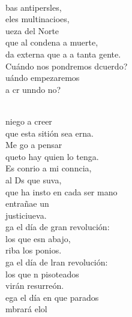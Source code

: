 \begin{cancion}
	\jump\\
	bas antipersles,\\
	eles multinacioes,\\
	ueza del Norte\\
	que al  condena a muerte,\\
	da externa que a a tanta gente.\\
	Cuándo nos pondremos dcuerdo?\\
	uándo empezaremos\\
	a cr unndo no?  \\\jump\\
	\begin{chorus}%
	 niego a creer\\
	que esta sitión sea erna.\\
	Me go a pensar \\
	queto hay quien lo tenga.\\
	Es conrio a mi conncia,\\
	al Ds que suva,\\
	que ha insto en cada ser mano\\
	entrañae un\\
	justiciueva.   \\
\jump
	ga el día de gran revolución:\\
	los que esn abajo,  \\
	riba los ponios.\\
	ga el día de lran revolución:\\
	los que n pisoteados \\
	virán resurreón.\\
\jump
	ega el día en que parados\\
	mbrará elol\\
	\end{chorus}%
	\jump\\
\end{cancion}%
